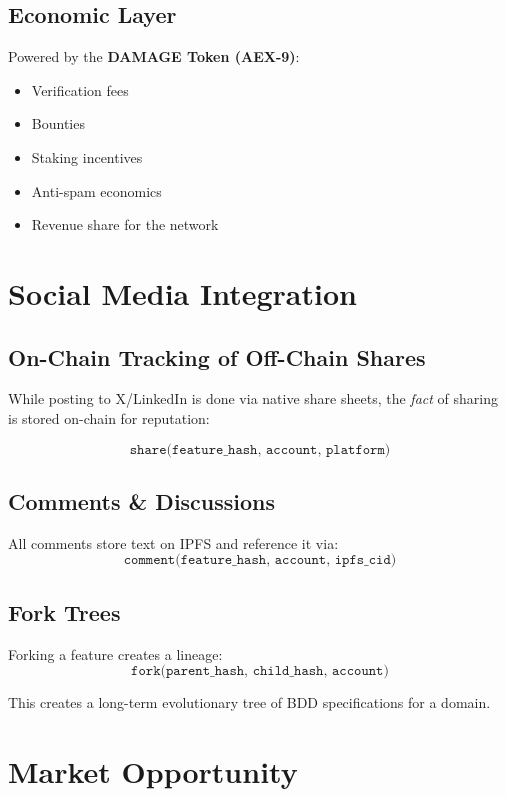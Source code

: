 \documentclass[12pt,a4paper]{article}
\begin{document}
\subsection{Economic Layer}

Powered by the \textbf{DAMAGE Token (AEX-9)}:
\begin{itemize}
    \item Verification fees
    \item Bounties
    \item Staking incentives
    \item Anti-spam economics
    \item Revenue share for the network
\end{itemize}

\section{Social Media Integration}

\subsection{On-Chain Tracking of Off-Chain Shares}

While posting to X/LinkedIn is done via native share sheets, the \emph{fact} of sharing is stored on-chain for reputation:

\[
\texttt{share(feature\_hash, account, platform)}
\]

\subsection{Comments \& Discussions}

All comments store text on IPFS and reference it via:
\[
\texttt{comment(feature\_hash, account, ipfs\_cid)}
\]

\subsection{Fork Trees}

Forking a feature creates a lineage:
\[
\texttt{fork(parent\_hash,\ child\_hash,\ account)}
\]

This creates a long-term evolutionary tree of BDD specifications for a domain.

\section{Market Opportunity}
\end{document}
